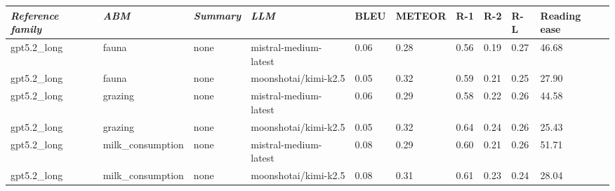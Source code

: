 \begin{tabular}{|l|l|l|l|l|l|l|l|l|l|}
\hline
\textit{\textbf{Reference family}} & \textit{\textbf{ABM}} & \textit{\textbf{Summary}} & \textit{\textbf{LLM}} & BLEU & METEOR & R-1 & R-2 & R-L & Reading ease \\
 \hline
 gpt5.2\_long & fauna & none & mistral-medium-latest & 0.06 & 0.28 & 0.56 & 0.19 & 0.27 & 46.68 \\
 \hline
 gpt5.2\_long & fauna & none & moonshotai/kimi-k2.5 & 0.05 & 0.32 & 0.59 & 0.21 & 0.25 & 27.90 \\
 \hline
 gpt5.2\_long & grazing & none & mistral-medium-latest & 0.06 & 0.29 & 0.58 & 0.22 & 0.26 & 44.58 \\
 \hline
 gpt5.2\_long & grazing & none & moonshotai/kimi-k2.5 & 0.05 & 0.32 & 0.64 & 0.24 & 0.26 & 25.43 \\
 \hline
 gpt5.2\_long & milk\_consumption & none & mistral-medium-latest & 0.08 & 0.29 & 0.60 & 0.21 & 0.26 & 51.71 \\
 \hline
 gpt5.2\_long & milk\_consumption & none & moonshotai/kimi-k2.5 & 0.08 & 0.31 & 0.61 & 0.23 & 0.24 & 28.04 \\
\hline
\end{tabular}
